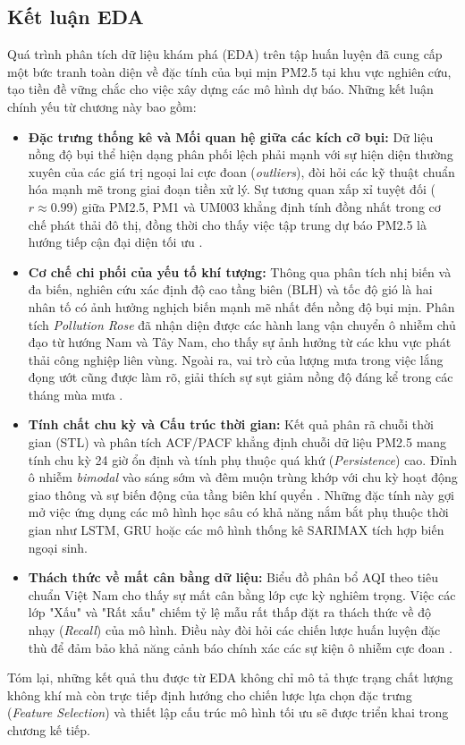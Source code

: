 \subsection{Kết luận EDA}
Quá trình phân tích dữ liệu khám phá (EDA) trên tập huấn luyện đã cung cấp một bức tranh toàn diện về đặc tính của bụi mịn PM2.5 tại khu vực nghiên cứu, tạo tiền đề vững chắc cho việc xây dựng các mô hình dự báo. Những kết luận chính yếu từ chương này bao gồm:
\begin{itemize}
    \item \textbf{Đặc trưng thống kê và Mối quan hệ giữa các kích cỡ bụi:} Dữ liệu nồng độ bụi thể hiện dạng phân phối lệch phải mạnh với sự hiện diện thường xuyên của các giá trị ngoại lai cực đoan (\textit{outliers}), đòi hỏi các kỹ thuật chuẩn hóa mạnh mẽ trong giai đoạn tiền xử lý. Sự tương quan xấp xỉ tuyệt đối ($r \approx 0.99$) giữa PM2.5, PM1 và UM003 khẳng định tính đồng nhất trong cơ chế phát thải đô thị, đồng thời cho thấy việc tập trung dự báo PM2.5 là hướng tiếp cận đại diện tối ưu \cite{Le2024}.
    \item \textbf{Cơ chế chi phối của yếu tố khí tượng:} Thông qua phân tích nhị biến và đa biến, nghiên cứu xác định độ cao tầng biên (BLH) và tốc độ gió là hai nhân tố có ảnh hưởng nghịch biến mạnh mẽ nhất đến nồng độ bụi mịn. Phân tích \textit{Pollution Rose} đã nhận diện được các hành lang vận chuyển ô nhiễm chủ đạo từ hướng Nam và Tây Nam, cho thấy sự ảnh hưởng từ các khu vực phát thải công nghiệp liên vùng. Ngoài ra, vai trò của lượng mưa trong việc lắng đọng ướt cũng được làm rõ, giải thích sự sụt giảm nồng độ đáng kể trong các tháng mùa mưa \cite{Seinfeld2016}.
    \item \textbf{Tính chất chu kỳ và Cấu trúc thời gian:} Kết quả phân rã chuỗi thời gian (STL) và phân tích ACF/PACF khẳng định chuỗi dữ liệu PM2.5 mang tính chu kỳ 24 giờ ổn định và tính phụ thuộc quá khứ (\textit{Persistence}) cao. Đỉnh ô nhiễm \textit{bimodal} vào sáng sớm và đêm muộn trùng khớp với chu kỳ hoạt động giao thông và sự biến động của tầng biên khí quyển \cite{Tai2010}. Những đặc tính này gợi mở việc ứng dụng các mô hình học sâu có khả năng nắm bắt phụ thuộc thời gian như LSTM, GRU hoặc các mô hình thống kê SARIMAX tích hợp biến ngoại sinh.
    \item \textbf{Thách thức về mất cân bằng dữ liệu:} Biểu đồ phân bổ AQI theo tiêu chuẩn Việt Nam cho thấy sự mất cân bằng lớp cực kỳ nghiêm trọng. Việc các lớp "Xấu" và "Rất xấu" chiếm tỷ lệ mẫu rất thấp đặt ra thách thức về độ nhạy (\textit{Recall}) của mô hình. Điều này đòi hỏi các chiến lược huấn luyện đặc thù để đảm bảo khả năng cảnh báo chính xác các sự kiện ô nhiễm cực đoan \cite{Box2015}.
\end{itemize}
Tóm lại, những kết quả thu được từ EDA không chỉ mô tả thực trạng chất lượng không khí mà còn trực tiếp định hướng cho chiến lược lựa chọn đặc trưng (\textit{Feature Selection}) và thiết lập cấu trúc mô hình tối ưu sẽ được triển khai trong chương kế tiếp.

